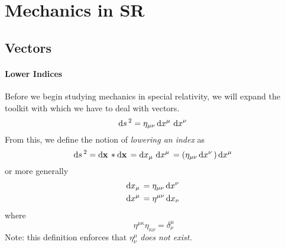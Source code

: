 \chapter{Mechanics in SR}
\section{Vectors}
\subsubsection{Lower Indices}
Before we begin studying mechanics in special relativity, we will expand the toolkit with which we have to deal with vectors.
\[\d{s}^2 = \eta_{\mu\nu}\d{x^\mu}\d{x^\nu}\]
From this, we define the notion of \emph{lowering an index} as
\[\d{s}^2 = \d{\vb x}*\d{\vb x} = \d{x_\mu}\d{x^\mu} = (\eta_{\mu\nu}\d{x^\nu}) \d{x^\mu}\]
or more generally
\begin{subequations}
	\begin{align}
		\d{x_\mu} &= \eta_{\mu\nu}\d{x^\nu}\\
		\d{x^\mu} &= \eta^{\mu\nu}\d{x_\nu}
	\end{align}
\end{subequations}
where
\begin{equation}
	\eta^{\mu \kappa}\eta_{\kappa\nu} = \delta_\nu^\mu	
\end{equation}
Note: this definition enforces that \(\eta_\nu^\mu\) \emph{does not exist.}

